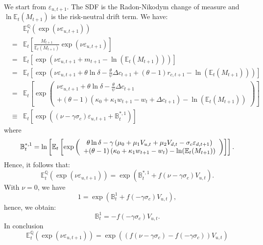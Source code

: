 \documentclass[11pt]{article}
\begin{document}
\begin{small}
We start from $\varepsilon _{u,t+1}$. The SDF is the Radon-Nikodym change of
measure and $\ln \mathbb{E}_{t}(M_{t+1})$ is the risk-neutral drift term. We
have:
\begin{eqnarray*}
&&\mathbb{E}_{t}^{\mathbb{Q}}(\exp \left( \nu \varepsilon _{u,t+1}\right) )
\\
&=&\mathbb{E}_{t}\left[ \frac{M_{t+1}}{\mathbb{E}_{t}(M_{t+1})}\exp \left(
\nu \varepsilon _{u,t+1}\right) \right] \\
&=&\mathbb{E}_{t}\left[ \exp \left( \nu \varepsilon _{u,t+1}+m_{t+1}-\ln (%
\mathbb{E}_{t}(M_{t+1}))\right) \right] \\
&=&\mathbb{E}_{t}\left[ \exp \left( \nu \varepsilon _{u,t+1}+\theta \ln
\delta -\frac{\theta }{\psi }\Delta c_{t+1}+(\theta -1)r_{c,t+1}-\ln (%
\mathbb{E}_{t}(M_{t+1}))\right) \right] \\
&=&\mathbb{E}_{t}\left[ \exp \left(
\begin{array}{c}
\nu \varepsilon _{u,t+1}+\theta \ln \delta -\frac{\theta }{\psi }\Delta
c_{t+1} \\
+(\theta -1)\left( \kappa _{0}+\kappa _{1}w_{t+1}-w_{t}+\Delta
c_{t+1}\right) -\ln (\mathbb{E}_{t}(M_{t+1}))%
\end{array}%
\right) \right] \\
&\equiv &\mathbb{E}_{t}\left[ \exp \left( \left( \nu -\gamma \sigma
_{c}\right) \varepsilon _{u,t+1}+\mathbb{B}_{t}^{\ast ,1}\right) \right]
\end{eqnarray*}%
where%
\begin{equation*}
\mathbb{B}_{t}^{\ast ,1}=\ln \left[ \mathbb{E}_{t}\left[ \exp \left(
\begin{array}{c}
\theta \ln \delta -\gamma \left( \mu _{0}+\mu_1V_{u,t}+\mu_2V_{d,t}-\sigma
_{c}\varepsilon _{d,t+1}\right) \\
+(\theta -1)\left( \kappa _{0}+\kappa _{1}w_{t+1}-w_{t}\right) -\ln (\mathbb{%
E}_{t}(M_{t+1}))%
\end{array}%
\right) \right] \right] .
\end{equation*}%
Hence, it follows that:%
\begin{equation*}
\mathbb{E}_{t}^{\mathbb{Q}}(\exp \left( \nu \varepsilon _{u,t+1}\right)
)=\exp \left( \mathbb{B}_{t}^{\ast ,1}+f(\nu -\gamma \sigma
_{c})V_{u,t}\right) .
\end{equation*}%
With $\nu =0$, we have%
\begin{equation*}
1=\exp \left( \mathbb{B}_{t}^{1}+f(-\gamma \sigma _{c})V_{u,t}\right) ,
\end{equation*}%
hence, we obtain:%
\begin{equation*}
\mathbb{B}_{t}^{1}=-f(-\gamma \sigma _{c})V_{u,t}.
\end{equation*}%
In conclusion%
\begin{equation*}
\mathbb{E}_{t}^{\mathbb{Q}}(\exp \left( \nu \varepsilon _{u,t+1}\right)
)=\exp \left( \left( f(\nu -\gamma \sigma _{c})-f(-\gamma \sigma
_{c})\right) V_{u,t}\right)
\end{equation*}


\end{small}
\end{document}
